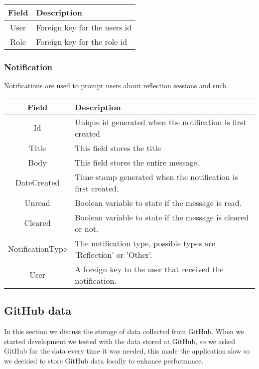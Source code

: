 \vspace{0.5cm}
\begin{tabularx}{\linewidth}{| c | X |}
    \hline
    \rowcolor[gray]{0.8}
    \textbf{Field} & \textbf{Description} \\
    \hline
    User & Foreign key for the users id \\ \hline
    Role & Foreign key for the role id \\
    \hline
\end{tabularx}
\vspace{0.5cm}

\subsubsection*{Notification}
Notifications are used to prompt users about reflection sessions and such. \\

\vspace{0.5cm}
\begin{tabularx}{\linewidth}{| c | X |}
    \hline
    \rowcolor[gray]{0.8}
    \textbf{Field} & \textbf{Description} \\
    \hline
    Id & Unique id generated when the notification is first created\\ \hline
    Title & This field stores the title\\ \hline
   	Body & This field stores the entire message.\\ \hline
    DateCreated & Time stamp generated when the notification is first created.\\ \hline
    Unread & Boolean variable to state if the message is read.\\ \hline
    Cleared & Boolean variable to state if the message is cleared or not.\\ \hline
    NotificationType & The notification type, possible types are 'Reflection' or 'Other'.\\ \hline
    User & A foreign key to the user that received the notification.\\ 
    \hline
\end{tabularx}
\vspace{0.5cm}

\subsection{GitHub data}
In this section we discuss the storage of data collected from GitHub. When we started development we tested with the data stored at GitHub, so we asked GitHub for the data every time it was needed, this made the application slow so we decided to store GitHub data locally to enhance performance. 


